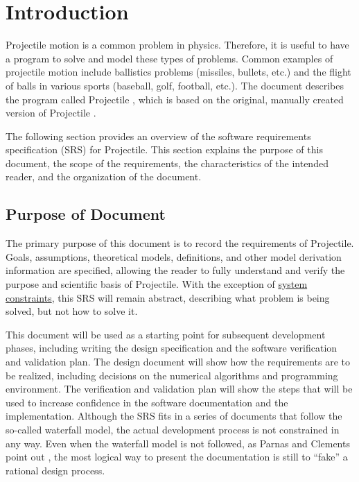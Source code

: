 \documentclass[12pt]{article}
\begin{document}
\section{Introduction}
\label{Sec:Intro}
Projectile motion is a common problem in physics. Therefore, it is useful to have a program to solve and model these types of problems. Common examples of projectile motion include ballistics problems (missiles, bullets, etc.) and the flight of balls in various sports (baseball, golf, football, etc.). The document describes the program called Projectile , which is based on the original, manually created version of Projectile \cite{projectileOriginal}.

The following section provides an overview of the software requirements specification (SRS) for Projectile. This section explains the purpose of this document, the scope of the requirements, the characteristics of the intended reader, and the organization of the document.

\subsection{Purpose of Document}
\label{Sec:DocPurpose}
The primary purpose of this document is to record the requirements of Projectile. Goals, assumptions, theoretical models, definitions, and other model derivation information are specified, allowing the reader to fully understand and verify the purpose and scientific basis of Projectile. With the exception of \hyperref[Sec:SysConstraints]{system constraints}, this SRS will remain abstract, describing what problem is being solved, but not how to solve it.

This document will be used as a starting point for subsequent development phases, including writing the design specification and the software verification and validation plan. The design document will show how the requirements are to be realized, including decisions on the numerical algorithms and programming environment. The verification and validation plan will show the steps that will be used to increase confidence in the software documentation and the implementation. Although the SRS fits in a series of documents that follow the so-called waterfall model, the actual development process is not constrained in any way. Even when the waterfall model is not followed, as Parnas and Clements point out \cite{parnasClements1986}, the most logical way to present the documentation is still to ``fake'' a rational design process.
\end{document}
